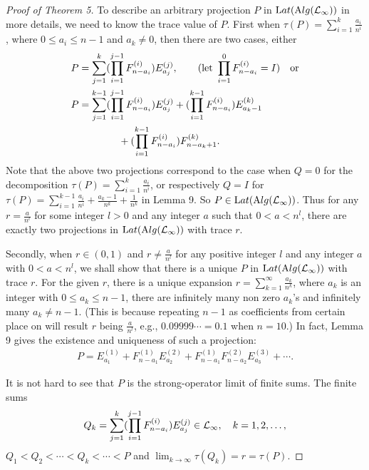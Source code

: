 \begin{proof}[Proof of Theorem 5]
To describe an
arbitrary projection $P$ in $\mathrm Lat(\mathrm Alg(\mathcal L_\infty))$ in more
details, we need to know the trace value of $P$. First when
$\tau(P) = \sum_{i=1}^{k}\frac{a_{i}}{n^{i}}$, where $0\leq a_i\leq
n-1$ and $a_{k} \neq 0$, then there are two cases, either
\begin{align*}
P &= \sum_{j = 1}^{k} (\prod_{i =
1}^{j-1}F_{n-a_{i}}^{(i)})E_{a_{j}}^{(j)} ,\qquad  ({\rm let}\
\prod_{i = 1}^{0}F_{n-a_{i}}^{(i)} = I)\quad {\rm or}\cr
 P & = \sum_{j
= 1}^{k-1} (\prod_{i = 1}^{j-1}F_{n-a_{i}}^{(i)})E_{a_{j}}^{(j)} +
(\prod_{i = 1}^{k-1}F_{n-a_{i}}^{(i)})E_{a_{k}-1}^{(k)} \\
& \qquad \qquad +
(\prod_{i = 1}^{k-1}F_{n-a_{i}}^{(i)})F_{n-a_{k}+1}^{(k)}.
\end{align*}
Note that the above two projections correspond to the case when
$Q=0$ for the decomposition
$\tau(P)=\sum_{i=1}^{k}\frac{a_{i}}{n^{i}}$, or respectively $Q=I$
for $\tau(P)=\sum_{i=1}^{k-1}
\frac{a_{i}}{n^{i}}+\frac{a_k-1}{n^k}+ \frac1{n^k}$ in Lemma 9.
So $P \in \mathrm Lat(\mathrm Alg(\mathcal L_\infty))$. Thus for any $r =
\frac{a}{n^{l}}$ for some integer $l
> 0$ and any integer $a$ such that $0 < a < n^{l}$, there are
exactly two projections in $\mathrm Lat(\mathrm Alg(\mathcal L_\infty))$ with trace $r$.

Secondly, when $r \in (0,1)$ and $r\neq \frac{a}{n^{l}}$ for any
positive integer $l$ and any integer $a$ with $0 < a < n^{l}$, we
shall show that there is a unique $P$ in $\mathrm Lat(\mathrm Alg(\mathcal L_\infty))$
with trace $r$. For the given $r$, there is a unique expansion $r
= \sum_{k=1}^{\infty}\frac{a_{k}}{n^{k}}$, where $a_k$ is an
integer with $0 \leq a_{k} \leq n-1$, there are infinitely many
non zero $a_k$'s and infinitely many $a_k\neq n-1$. (This is
because repeating $n-1$ as coefficients from certain place on will
result $r$ being $\frac{a}{n^l}$, e.g., $0.09999\cdots=0.1$ when
$n=10$.) In fact, Lemma 9 gives the existence and uniqueness of
such a projection:
\begin{align*}
P=E_{a_{1}}^{(1)} + F_{n-a_{1}}^{(1)}E_{a_{2}}^{(2)} +
         F_{n-a_{1}}^{(1)}F_{n-a_{2}}^{(2)}E_{a_{3}}^{(3)} + \cdots.
\end{align*}

It is not hard to see that $P$ is the strong-operator limit of
finite sums. The finite sums
\begin{align*}
Q_{k} =  \sum_{j = 1}^{k} (\prod_{i =
1}^{j-1}F_{n-a_{i}}^{(i)})E_{a_{j}}^{(j)}\in\mathcal L_\infty ,  \quad  k
= 1 , 2,\ldots,
\end{align*}
 $Q_{1} < Q_{2} < \cdots < Q_{k} < \cdots<P$ and $\lim_{k
\to\infty} \tau(Q_{k}) = r=\tau(P)$.
\end{proof}


